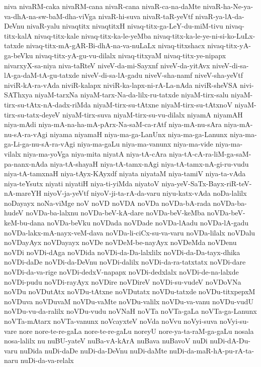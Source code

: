 {niva
nivaRM-caka
nivaRM-cana
nivaR-cana
nivaR-ca-na-daMte
nivaR-ha-Ne-ya-va-dhA-na-sw-baM-dha-viVga
nivaR-hi-suva
nivaR-taR-yeVtf
nivaR-ya-lA-da-DeVnu
nivaR-yalu
nivaqtitx
nivaqtitxH
nivaq-titx-ga-LeY-du-miM-tivu
nivaq-titx-kalA
nivaq-titx-kale
nivaq-titx-ka-le-yeMba
nivaq-titx-ka-le-ye-ni-si-ko-LuLx-tatxde
nivaq-titx-mA-gAR-Bi-dhA-na-va-nuLaLx
nivaq-titxshacx
nivaq-titx-yA-ga-beVku
nivaq-titx-yA-gu-vu-dilalx
nivaq-titxyaM
nivaq-titx-ye-nipapx
nivarxyX-sa-niya
niva-taRteV
niveV-da-mi-Sayxnf
niveV-da-yitAvx
niveV-di-sa-lA-ga-daM-tA-gu-tatxde
niveV-di-sa-lA-gadu
niveV-sha-namf
niveV-sha-yeVtf
niviR-kA-ra-vAda
niviR-kalapx
niviR-ka-lapx-ni-rA-La-nAda
niviR-sheVSA
nivi-SAThxya
niyaM-tarxNa
niyaM-tarx-Na-da-lilx-ru-tatxde
niyaM-tirx-salu
niyaM-tirx-su-tAtx-nA-dadx-riMda
niyaM-tirx-su-tAtxne
niyaM-tirx-su-tAtxnoV
niyaM-tirx-su-tatx-deyeV
niyaM-tirx-suva
niyaM-tirx-su-vu-dilalx
niyamA
niyamAH
niya-mAdi
niya-mA-na-ha-mA-pArx-Na-saM-ca-rAtf
niya-mA-nu-sAra
niya-mA-nu-sA-ra-vAgi
niyama
niyamaH
niya-ma-ga-LanUnx
niya-ma-ga-Lanunx
niya-ma-ga-Li-ga-nu-sA-ra-vAgi
niya-ma-gaLu
niya-ma-vanunx
niya-ma-vide
niya-ma-vilalx
niya-ma-yoVga
niya-mita
niyatA
niya-tA-cAra
niya-tA-cA-ra-liM-ga-saM-pa-nanx-nAda
niya-tA-shayaH
niya-tA-tamx-nAgi
niya-tA-tamx-nA-gi-ru-vudu
niya-tA-tamxnaH
niya-tAyx-KAyxdf
niyata
niyataM
niya-tamiV
niya-ta-vAda
niya-teYsutx
niyati
niyatiH
niya-ti-yiMda
niyatoV
niya-yeV-SaTx-Bayx-riR-teV-nA-mareYH
niyoV-ja-yeVtf
niyoV-ji-ta-rA-da-varu
niyu-katx-vAda
noDa-lalilx
noDayayx
noNa-viMge
noV
noVD
noVDA
noVDa
noVDa-bA-rada
noVDa-ba-hudeV
noVDa-ba-lalxnu
noVDa-beV-kA-dare
noVDa-beV-keMba
noVDa-beV-keM-bu-dana
noVDa-beVku
noVDada
noVDade
noVDa-lAadu
noVDa-lA-gadu
noVDa-lakx-mA-nayx-veM-dava
noVDa-li-ciCx-su-va-varu
noVDa-lilalx
noVDalu
noVDayAyx
noVDayayx
noVDe
noVDeM-be-nayAyx
noVDeMda
noVDenu
noVDi
noVDi-dAga
noVDida
noVDi-da-Da-lalxlilx
noVDi-da-Da-tayx-dhika
noVDi-daDe
noVDi-da-DeVnu
noVDi-dalilx
noVDi-da-ra-tatxtatx
noVDi-dare
noVDi-da-va-rige
noVDi-dedxV-napapx
noVDi-dedxlalx
noVDi-de-na-lalxde
noVDi-pudu
noVDi-rayAyx
noVDire
noVDireV
noVDi-su-vudeV
noVDoVNa
noVDu
noVDutAtx
noVDu-tAtxne
noVDutatx
noVDu-tatxde
noVDu-titxpepxM
noVDuva
noVDuvaM
noVDu-vaMte
noVDu-valilx
noVDu-va-vanu
noVDu-vudU
noVDu-vu-da-ralilx
noVDu-vudu
noVNaH
noVTa
noVTa-gaLa
noVTa-ga-Lanunx
noVTa-mAtarx
noVTa-vanunx
noVcayxteV
noVda
noVvu
noVyi-suva
noVyi-su-vare
nore
nore-te-re-gaLa
nore-te-re-gaLu
noreyU
nore-ya-ta-raM-ga-gaLu
nosala
nosa-lalilx
nu
nuBU-yateV
nuBa-vA-kArA
nuBava
nuBavoV
nuDi
nuDi-dA-Du-varu
nuDida
nuDi-daDe
nuDi-da-DeVnu
nuDi-daMte
nuDi-da-maR-hA-pu-rA-ta-naru
nuDi-da-va-relalx
}
